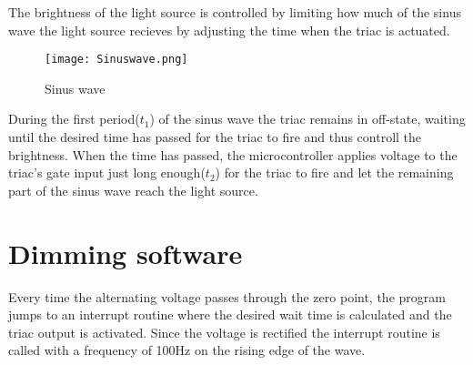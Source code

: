 \documentclass[11pt]{article}
\begin{document}
The brightness of the light source is controlled by limiting how much of the sinus wave the light source recieves by adjusting the time when the triac is actuated. 

	\begin{figure}[ht!]
    \centering
    \texttt{[image: Sinuswave.png]}
    \caption{Sinus wave}
    \label{fig:Sinus_wave}
\end{figure}

During the first period($t_{1}$) of the sinus wave the triac remains in off-state, waiting until the desired time has passed for the triac to fire and thus controll the brightness. When the time has passed, the microcontroller applies voltage to the triac's gate input just long enough($t_2$) for the triac to fire and let the remaining part of the sinus wave reach the light source.

\section{Dimming software}

Every time the alternating voltage passes through the zero point, the program jumps to an interrupt routine where the desired wait time is calculated and the triac output is activated. Since the voltage is rectified the interrupt routine is called with a frequency of 100Hz on the rising edge of the wave.
\end{document}
